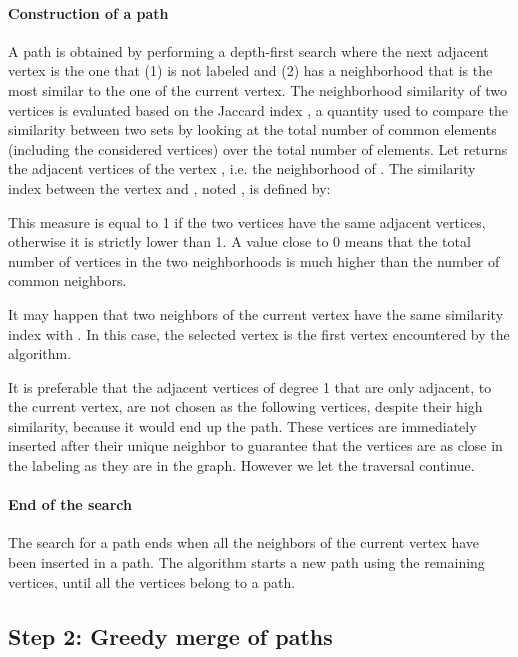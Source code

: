 \documentclass{scrartcl}
\theoremstyle{plain}
\begin{document}
\paragraph{Construction of a path}

A path is obtained by performing a depth-first search where the next adjacent 
vertex is the one that (1) is not labeled and (2) has a neighborhood that is the 
most similar to the one of the current vertex.  The neighborhood similarity of 
two vertices is evaluated based on the Jaccard index \cite{Jaccard1901}, a 
quantity used to compare the similarity between two sets by looking at the total 
number of common elements (including the considered vertices) over the total 
number of elements. Let  returns the adjacent vertices of the 
vertex , i.e. the neighborhood of . The similarity index between the 
vertex  and , noted , is defined by:


This measure is equal to 1 if the two vertices have the same adjacent vertices, 
otherwise it is strictly lower than 1. A value close to 0 means that the total 
number of vertices in the two neighborhoods is much higher than the number of 
common neighbors.

It may happen that two neighbors of the current vertex  have the same 
similarity index with . In this case, the selected vertex is the first vertex 
encountered by the algorithm.

It is preferable that the adjacent vertices of degree 1 that are only adjacent, 
to the current vertex, are not chosen as the following vertices, despite their 
high similarity, because it would end up the path. These vertices are 
immediately inserted after their unique neighbor to guarantee that the vertices 
are as close in the labeling as they are in the graph. However we let the 
traversal 
continue.

\paragraph{End of the search}

The search for a path ends when all the neighbors of the current vertex have 
been inserted in a path. The algorithm starts a new path using the remaining 
vertices, until all the vertices belong to a path.


\subsection{Step 2: Greedy merge of paths}
\label{subsec:step2}
\end{document}
